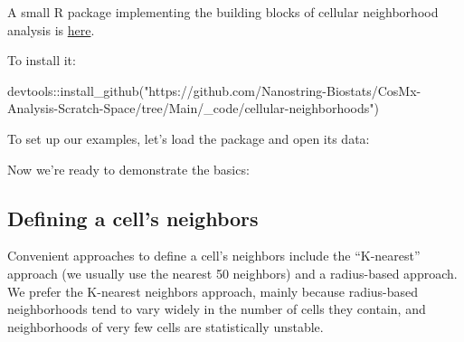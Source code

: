 \documentclass[
  letterpaper,
  DIV=11,
  numbers=noendperiod]{scrartcl}
\newenvironment{Shaded}{\begin{snugshade}}{\end{snugshade}}
\newcommand{\FunctionTok}[1]{\textcolor[rgb]{0.28,0.35,0.67}{#1}}
\newcommand{\NormalTok}[1]{\textcolor[rgb]{0.00,0.23,0.31}{#1}}
\newcommand{\OtherTok}[1]{\textcolor[rgb]{0.00,0.23,0.31}{#1}}
\newcommand{\SpecialCharTok}[1]{\textcolor[rgb]{0.37,0.37,0.37}{#1}}
\newcommand{\StringTok}[1]{\textcolor[rgb]{0.13,0.47,0.30}{#1}}
\begin{document}
A small R package implementing the building blocks of cellular
neighborhood analysis is \href{/_code/cellular-neighborhoods}{here}.

To install it:

\begin{Shaded}
\begin{Highlighting}[]
\NormalTok{devtools}\SpecialCharTok{::}\FunctionTok{install\_github}\NormalTok{(}\StringTok{"https://github.com/Nanostring{-}Biostats/CosMx{-}Analysis{-}Scratch{-}Space/tree/Main/\_code/cellular{-}neighborhoods"}\NormalTok{)}
\end{Highlighting}
\end{Shaded}

To set up our examples, let's load the package and open its data:

\begin{Shaded}
\end{Shaded}

Now we're ready to demonstrate the basics:

\hypertarget{defining-a-cells-neighbors}{%
\subsection{Defining a cell's
neighbors}\label{defining-a-cells-neighbors}}

Convenient approaches to define a cell's neighbors include the
``K-nearest'' approach (we usually use the nearest 50 neighbors) and a
radius-based approach. We prefer the K-nearest neighbors approach,
mainly because radius-based neighborhoods tend to vary widely in the
number of cells they contain, and neighborhoods of very few cells are
statistically unstable.
\end{document}
